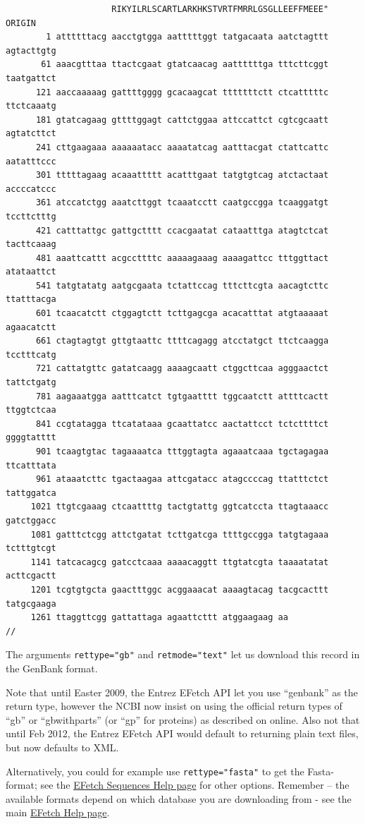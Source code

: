 \documentclass{report}
\begin{document}
\begin{verbatim}
                     RIKYILRLSCARTLARKHKSTVRTFMRRLGSGLLEEFFMEEE"
ORIGIN      
        1 attttttacg aacctgtgga aatttttggt tatgacaata aatctagttt agtacttgtg
       61 aaacgtttaa ttactcgaat gtatcaacag aattttttga tttcttcggt taatgattct
      121 aaccaaaaag gattttgggg gcacaagcat tttttttctt ctcatttttc ttctcaaatg
      181 gtatcagaag gttttggagt cattctggaa attccattct cgtcgcaatt agtatcttct
      241 cttgaagaaa aaaaaatacc aaaatatcag aatttacgat ctattcattc aatatttccc
      301 tttttagaag acaaattttt acatttgaat tatgtgtcag atctactaat accccatccc
      361 atccatctgg aaatcttggt tcaaatcctt caatgccgga tcaaggatgt tccttctttg
      421 catttattgc gattgctttt ccacgaatat cataatttga atagtctcat tacttcaaag
      481 aaattcattt acgccttttc aaaaagaaag aaaagattcc tttggttact atataattct
      541 tatgtatatg aatgcgaata tctattccag tttcttcgta aacagtcttc ttatttacga
      601 tcaacatctt ctggagtctt tcttgagcga acacatttat atgtaaaaat agaacatctt
      661 ctagtagtgt gttgtaattc ttttcagagg atcctatgct ttctcaagga tcctttcatg
      721 cattatgttc gatatcaagg aaaagcaatt ctggcttcaa agggaactct tattctgatg
      781 aagaaatgga aatttcatct tgtgaatttt tggcaatctt attttcactt ttggtctcaa
      841 ccgtatagga ttcatataaa gcaattatcc aactattcct tctcttttct ggggtatttt
      901 tcaagtgtac tagaaaatca tttggtagta agaaatcaaa tgctagagaa ttcatttata
      961 ataaatcttc tgactaagaa attcgatacc atagccccag ttatttctct tattggatca
     1021 ttgtcgaaag ctcaattttg tactgtattg ggtcatccta ttagtaaacc gatctggacc
     1081 gatttctcgg attctgatat tcttgatcga ttttgccgga tatgtagaaa tctttgtcgt
     1141 tatcacagcg gatcctcaaa aaaacaggtt ttgtatcgta taaaatatat acttcgactt
     1201 tcgtgtgcta gaactttggc acggaaacat aaaagtacag tacgcacttt tatgcgaaga
     1261 ttaggttcgg gattattaga agaattcttt atggaagaag aa
//
\end{verbatim}

The arguments \verb+rettype="gb"+ and \verb+retmode="text"+ let us download this record in the GenBank format.

Note that until Easter 2009, the Entrez EFetch API let you use ``genbank'' as the
return type, however the NCBI now insist on using the official return types of
``gb'' or ``gbwithparts'' (or ``gp'' for proteins) as described on online.
Also not that until Feb 2012, the Entrez EFetch API would default to returning
plain text files, but now defaults to XML.

Alternatively, you could for example use \verb+rettype="fasta"+ to get the Fasta-format; see the \href{http://www.ncbi.nlm.nih.gov/entrez/query/static/efetchseq\_help.html}{EFetch Sequences Help page} for other options. Remember -- the available formats depend on which database you are downloading from - see the main \href{http://eutils.ncbi.nlm.nih.gov/entrez/query/static/efetch\_help.html}{EFetch Help page}.
\end{document}
